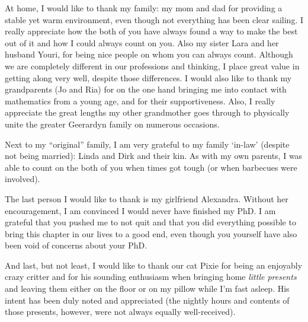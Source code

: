 {%
At home, I would like to thank my family: my mom and dad for providing a stable yet warm environment, even though not everything has been clear sailing.
I really appreciate how the both of you have always found a way to make the best out of it and how I could always count on you.
Also my sister Lara and her husband Youri, for being nice people on whom you can always count.
Although we are completely different in our professions and thinking, I place great value in getting along very well, despite those differences.
I would also like to thank my grandparents (Jo and Ria) for on the one hand bringing me into contact with mathematics from a young age, and for their supportiveness.
Also, I really appreciate the great lengths my other grandmother goes through to physically unite the greater Geerardyn family on numerous occasions.

Next to my ``original'' family, I am very grateful to my family `in-law' (despite not being married): Linda and Dirk and their kin.
As with my own parents, I was able to count on the both of you when times got tough (or when barbecues were involved).

The last person I would like to thank is my girlfriend Alexandra.
Without her encouragement, I am convinced I would never have finished my PhD.
I am grateful that you pushed me to not quit and that you did everything possible to bring this chapter in our lives to a good end, even though you yourself have also been void of concerns about your PhD.

And last, but not least, I would like to thank our cat Pixie for being an enjoyably crazy critter and for his sounding enthusiasm when bringing home \emph{little presents} and leaving them either on the floor or on my pillow while I'm fast asleep.
His intent has been duly noted and appreciated (the nightly hours and contents of those presents, however, were not always equally well-received).
}
